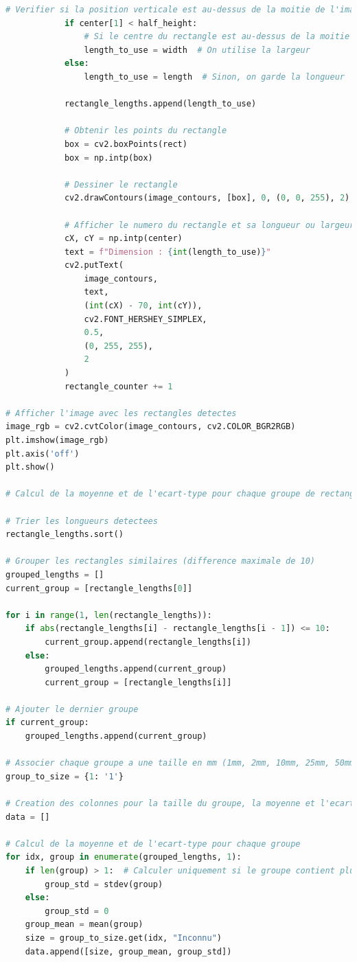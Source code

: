 \documentclass[11pt,letterpaper]{article}
\begin{document}
\begin{lstlisting}[language=python]
            # Verifier si la position verticale est au-dessus de la moitie de l'image
            if center[1] < half_height:
                # Si le centre du rectangle est au-dessus de la moitie de l'image
                length_to_use = width  # On utilise la largeur
            else:
                length_to_use = length  # Sinon, on garde la longueur

            rectangle_lengths.append(length_to_use)

            # Obtenir les points du rectangle
            box = cv2.boxPoints(rect)
            box = np.intp(box)

            # Dessiner le rectangle
            cv2.drawContours(image_contours, [box], 0, (0, 0, 255), 2)

            # Afficher le numero du rectangle et sa longueur ou largeur sur l'image
            cX, cY = np.intp(center)
            text = f"Dimension : {int(length_to_use)}"
            cv2.putText(
                image_contours,
                text,
                (int(cX) - 70, int(cY)),
                cv2.FONT_HERSHEY_SIMPLEX,
                0.5,
                (0, 255, 255),
                2
            )
            rectangle_counter += 1

# Afficher l'image avec les rectangles detectes
image_rgb = cv2.cvtColor(image_contours, cv2.COLOR_BGR2RGB)
plt.imshow(image_rgb)
plt.axis('off')
plt.show()

# Calcul de la moyenne et de l'ecart-type pour chaque groupe de rectangles similaires

# Trier les longueurs detectees
rectangle_lengths.sort()

# Grouper les rectangles similaires (difference maximale de 10)
grouped_lengths = []
current_group = [rectangle_lengths[0]]

for i in range(1, len(rectangle_lengths)):
    if abs(rectangle_lengths[i] - rectangle_lengths[i - 1]) <= 10:
        current_group.append(rectangle_lengths[i])
    else:
        grouped_lengths.append(current_group)
        current_group = [rectangle_lengths[i]]

# Ajouter le dernier groupe
if current_group:
    grouped_lengths.append(current_group)

# Associer chaque groupe a une taille en mm (1mm, 2mm, 10mm, 25mm, 50mm)
group_to_size = {1: '1'}

# Creation des colonnes pour la taille du groupe, la moyenne et l'ecart-type
data = []

# Calcul de la moyenne et de l'ecart-type pour chaque groupe
for idx, group in enumerate(grouped_lengths, 1):
    if len(group) > 1:  # Calculer uniquement si le groupe contient plus d'un rectangle
        group_std = stdev(group)
    else:
        group_std = 0
    group_mean = mean(group)
    size = group_to_size.get(idx, "Inconnu")
    data.append([size, group_mean, group_std])


\end{lstlisting}
\end{document}
